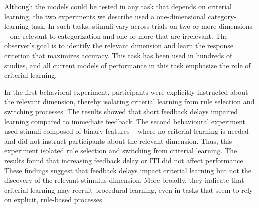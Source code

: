 \documentclass[doc, floatsintext]{apa7}
\begin{document}
Although the models could be tested in any task that depends
on criterial learning, the two experiments we describe used
a one-dimensional category-learning task. In such tasks,
stimuli vary across trials on two or more dimensions -- one
relevant to categorization and one or more that are
irrelevant. The observer's goal is to identify the relevant
dimension and learn the response criterion that maximizes
accuracy. This task has been used in hundreds of studies,
and all current models of performance in this task emphasize
the role of criterial learning.

In the first behavioral experiment, participants were
explicitly instructed about the relevant dimension, thereby
isolating criterial learning from rule selection and
switching processes. The results showed that short feedback
delays impaired learning compared to immediate feedback.
The second behavioural experiment used stimuli composed of
binary features -- where no criterial learning is needed --
and did not instruct participants about the relevant
dimension. Thus, this experiment isolated rule selection and
switching from criterial learning. The results found that
increasing feedback delay or ITI did not affect performance.
These findings suggest that feedback delays impact criterial
learning but not the discovery of the relevant stimulus
dimension.  More broadly, they indicate that criterial
learning may recruit procedural learning, even in tasks that
seem to rely on explicit, rule-based processes.
\end{document}

